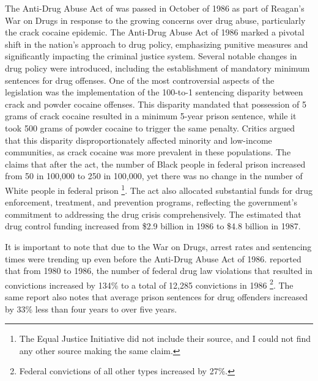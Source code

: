 \documentclass{article}
\begin{document}
The Anti-Drug Abuse Act of \citeyear{antidrugabuseact1986} was passed in October of 1986 as part of Reagan's War on Drugs in response to the growing concerns over drug abuse, particularly the crack cocaine epidemic. The Anti-Drug Abuse Act of 1986 marked a pivotal shift in the nation's approach to drug policy, emphasizing punitive measures and significantly impacting the criminal justice system. Several notable changes in drug policy were introduced, including the establishment of mandatory minimum sentences for drug offenses. One of the most controversial aspects of the legislation was the implementation of the 100-to-1 sentencing disparity between crack and powder cocaine offenses. This disparity mandated that possession of 5 grams of crack cocaine resulted in a minimum 5-year prison sentence, while it took 500 grams of powder cocaine to trigger the same penalty. Critics argued that this disparity disproportionately affected minority and low-income communities, as crack cocaine was more prevalent in these populations. The \cite{eji} claims that after the act, the number of Black people in federal prison increased from 50 in 100,000 to 250 in 100,000, yet there was no change in the number of White people in federal prison \footnote{The Equal Justice Initiative did not include their source, and I could not find any other source making the same claim.}. The act also allocated substantial funds for drug enforcement, treatment, and prevention programs, reflecting the government's commitment to addressing the drug crisis comprehensively. The \cite{drug_control_money} estimated that drug control funding increased from \$2.9 billion in 1986 to \$4.8 billion in 1987. 

It is important to note that due to the War on Drugs, arrest rates and sentencing times were trending up even before the Anti-Drug Abuse Act of 1986. \cite{bjs_1986} reported that from 1980 to 1986, the number of federal drug law violations that resulted in convictions increased by 134\% to a total of 12,285 convictions in 1986 \footnote{Federal convictions of all other types increased by 27\%.}. The same report also notes that average prison sentences for drug offenders increased by 33\% less than four years to over five years.
\end{document}

